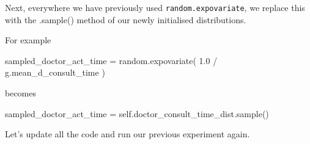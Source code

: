 \documentclass[
  letterpaper,
  DIV=11,
  numbers=noendperiod]{scrreprt}
\newenvironment{Shaded}{\begin{snugshade}}{\end{snugshade}}
\newcommand{\FloatTok}[1]{\textcolor[rgb]{0.68,0.00,0.00}{#1}}
\newcommand{\NormalTok}[1]{\textcolor[rgb]{0.00,0.23,0.31}{#1}}
\newcommand{\OperatorTok}[1]{\textcolor[rgb]{0.37,0.37,0.37}{#1}}
\newcommand{\VariableTok}[1]{\textcolor[rgb]{0.07,0.07,0.07}{#1}}
\begin{document}
Next, everywhere we have previously used \texttt{random.expovariate}, we
replace this with the .sample() method of our newly initialised
distributions.

For example

\begin{Shaded}
\begin{Highlighting}[]
\NormalTok{sampled\_doctor\_act\_time }\OperatorTok{=}\NormalTok{ random.expovariate(}
    \FloatTok{1.0} \OperatorTok{/}\NormalTok{ g.mean\_d\_consult\_time}
\NormalTok{)}
\end{Highlighting}
\end{Shaded}

becomes

\begin{Shaded}
\begin{Highlighting}[]
\NormalTok{sampled\_doctor\_act\_time }\OperatorTok{=} \VariableTok{self}\NormalTok{.doctor\_consult\_time\_dist.sample()}
\end{Highlighting}
\end{Shaded}

Let's update all the code and run our previous experiment again.
\end{document}
